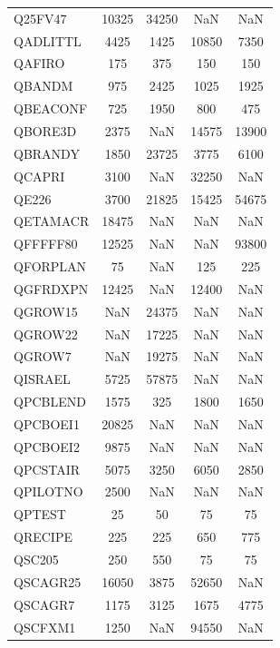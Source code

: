 \begin{longtable}{lcccc}
Q25FV47  &    10325 & 34250 &      NaN &      NaN \\
QADLITTL &     4425 &  1425 &    10850 &     7350 \\
QAFIRO   &      175 &   375 &      150 &      150 \\
QBANDM   &      975 &  2425 &     1025 &     1925 \\
QBEACONF &      725 &  1950 &      800 &      475 \\
QBORE3D  &     2375 &   NaN &    14575 &    13900 \\
QBRANDY  &     1850 & 23725 &     3775 &     6100 \\
QCAPRI   &     3100 &   NaN &    32250 &      NaN \\
QE226    &     3700 & 21825 &    15425 &    54675 \\
QETAMACR &    18475 &   NaN &      NaN &      NaN \\
QFFFFF80 &    12525 &   NaN &      NaN &    93800 \\
QFORPLAN &       75 &   NaN &      125 &      225 \\
QGFRDXPN &    12425 &   NaN &    12400 &      NaN \\
QGROW15  &      NaN & 24375 &      NaN &      NaN \\
QGROW22  &      NaN & 17225 &      NaN &      NaN \\
QGROW7   &      NaN & 19275 &      NaN &      NaN \\
QISRAEL  &     5725 & 57875 &      NaN &      NaN \\
QPCBLEND &     1575 &   325 &     1800 &     1650 \\
QPCBOEI1 &    20825 &   NaN &      NaN &      NaN \\
QPCBOEI2 &     9875 &   NaN &      NaN &      NaN \\
QPCSTAIR &     5075 &  3250 &     6050 &     2850 \\
QPILOTNO &     2500 &   NaN &      NaN &      NaN \\
QPTEST   &       25 &    50 &       75 &       75 \\
QRECIPE  &      225 &   225 &      650 &      775 \\
QSC205   &      250 &   550 &       75 &       75 \\
QSCAGR25 &    16050 &  3875 &    52650 &      NaN \\
QSCAGR7  &     1175 &  3125 &     1675 &     4775 \\
QSCFXM1  &     1250 &   NaN &    94550 &      NaN \\

\end{longtable}
